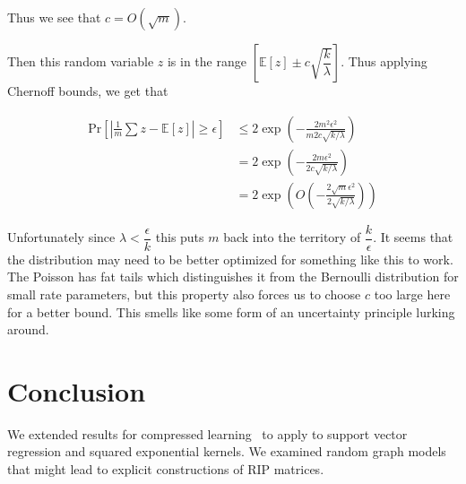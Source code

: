 \documentclass[english]{article}
\theoremstyle{plain}
\newcommand{\E}{\mathbb{E}}
\begin{document}
Thus we see that $c = O(\sqrt{m})$. 

Then this random variable $z$ is in the range $\left[ \E[z] \pm c\sqrt{\dfrac{k}{\lambda}}\right]$. Thus applying Chernoff bounds, we get that

\begin{align*}
	\text{Pr}\left[ \left| \frac{1}{m} \sum z  - \E[z]\right| \ge \epsilon\right] &\le 2\exp\left(-\frac{2m^2 \epsilon^2}{m 2c\sqrt{k/\lambda}}\right)\\
	&= 2\exp\left(-\frac{2m\epsilon^2}{2c\sqrt{k/\lambda}}\right)\\
	&= 2\exp\left(O\left(-\frac{2\sqrt{m}\epsilon^2}{2\sqrt{k/\lambda}}\right)\right)
\end{align*}

Unfortunately since $\lambda < \dfrac{\epsilon}{k}$ this puts $m$ back into the territory of $\dfrac{k}{\epsilon}$. It seems that the distribution may need to be better optimized for something like this to work. The Poisson has fat tails which distinguishes it from the Bernoulli distribution for small rate parameters, but this property also forces us to choose $c$ too large here for a better bound. This smells like some form of an uncertainty principle lurking around. 



\section{Conclusion}
We extended results for compressed learning~\citep{Calderbank09} to apply to support vector regression and squared exponential kernels. We examined random graph models that might lead to explicit constructions of RIP matrices. 
\end{document}
